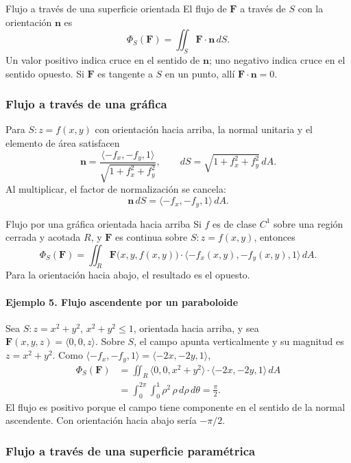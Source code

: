 \begin{mydefinition}{Flujo a través de una superficie orientada}
El flujo de $\mathbf F$ a través de $S$ con la orientación $\mathbf n$ es
\[
\Phi_S(\mathbf F)=\iint_S\mathbf F\cdot\mathbf n\,dS.
\]
Un valor positivo indica cruce en el sentido de $\mathbf n$; uno negativo indica cruce en el sentido opuesto. Si $\mathbf F$ es tangente a $S$ en un punto, allí $\mathbf F\cdot\mathbf n=0$.
\end{mydefinition}

\subsubsection{Flujo a través de una gráfica}

Para $S:z=f(x,y)$ con orientación hacia arriba, la normal unitaria y el elemento de área satisfacen
\[
\mathbf n=\frac{\langle-f_x,-f_y,1\rangle}
{\sqrt{1+f_x^2+f_y^2}},
\qquad
dS=\sqrt{1+f_x^2+f_y^2}\,dA.
\]
Al multiplicar, el factor de normalización se cancela:
\[
\mathbf n\,dS=\langle-f_x,-f_y,1\rangle\,dA.
\]
\begin{mytheorem}{Flujo por una gráfica orientada hacia arriba}
Si $f$ es de clase $C^1$ sobre una región cerrada y acotada $R$, y $\mathbf F$ es continua sobre $S:z=f(x,y)$, entonces
\[
\Phi_S(\mathbf F)
=\iint_R\mathbf F\bigl(x,y,f(x,y)\bigr)
\cdot\langle-f_x(x,y),-f_y(x,y),1\rangle\,dA.
\]
Para la orientación hacia abajo, el resultado es el opuesto.
\end{mytheorem}

\paragraph{Ejemplo 5. Flujo ascendente por un paraboloide}
Sea $S:z=x^2+y^2$, $x^2+y^2\leq1$, orientada hacia arriba, y sea $\mathbf F(x,y,z)=\langle0,0,z\rangle$. Sobre $S$, el campo apunta verticalmente y su magnitud es $z=x^2+y^2$. Como $\langle-f_x,-f_y,1\rangle=\langle-2x,-2y,1\rangle$,
\begin{align*}
\Phi_S(\mathbf F)
&=\iint_R\langle0,0,x^2+y^2\rangle
\cdot\langle-2x,-2y,1\rangle\,dA\\
&=\int_0^{2\pi}\int_0^1\rho^2\,\rho\,d\rho\,d\theta
=\frac{\pi}{2}.
\end{align*}
El flujo es positivo porque el campo tiene componente en el sentido de la normal ascendente. Con orientación hacia abajo sería $-\pi/2$.

\subsubsection{Flujo a través de una superficie paramétrica}

